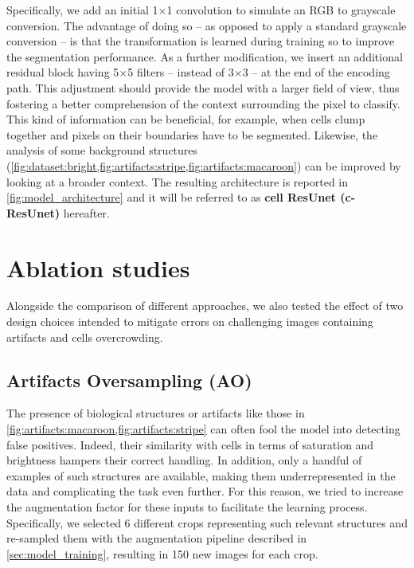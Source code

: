 Specifically, we add an initial 1$\times$1 convolution to simulate an RGB to grayscale conversion.
The advantage of doing so -- as opposed to apply a standard grayscale conversion -- is that the transformation is learned during training so to improve the segmentation performance.
As a further modification, we insert an additional residual block having 5$\times$5 filters -- instead of 3$\times$3 -- at the end of the encoding path. This adjustment should provide the model with a larger field of view, thus fostering a better comprehension of the context surrounding the pixel to classify.
This kind of information can be beneficial, for example, when cells clump together and pixels on their boundaries have to be segmented. 
Likewise, the analysis of some background structures (\cref{fig:dataset:bright,fig:artifacts:stripe,fig:artifacts:macaroon}) can be improved by looking at a broader context.
The resulting architecture is reported in \cref{fig:model_architecture} and it will be referred to as \textbf{cell ResUnet (c-ResUnet)} hereafter.

\section{Ablation studies}
\label{sec:ablation_studies}

Alongside the comparison of different approaches, we also tested the effect of two design choices intended to mitigate errors on challenging images containing artifacts and cells overcrowding.

\subsection{Artifacts Oversampling (AO)}

The presence of biological structures or artifacts like those in \cref{fig:artifacts:macaroon,fig:artifacts:stripe}  can often fool the model into detecting false positives. 
Indeed, their similarity with cells in terms of saturation and brightness hampers their correct handling.%
In addition, only a handful of examples of such structures are available, making them underrepresented in the data and complicating the task even further.
For this reason, we tried to increase the augmentation factor for these inputs to facilitate the learning process. Specifically, we selected 6 different crops representing such relevant structures and re-sampled them with the augmentation pipeline described in \cref{sec:model_training}, resulting in 150 new images for each crop.

